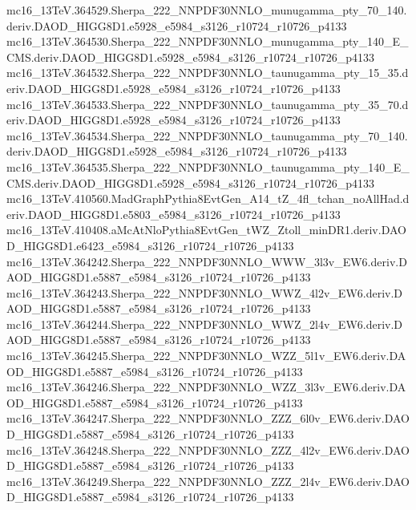 \begin{scriptsize}
mc16\_13TeV.364529.Sherpa\_222\_NNPDF30NNLO\_munugamma\_pty\_70\_140.deriv.DAOD\_HIGG8D1.e5928\_e5984\_s3126\_r10724\_r10726\_p4133 \\
mc16\_13TeV.364530.Sherpa\_222\_NNPDF30NNLO\_munugamma\_pty\_140\_E\_CMS.deriv.DAOD\_HIGG8D1.e5928\_e5984\_s3126\_r10724\_r10726\_p4133 \\
mc16\_13TeV.364532.Sherpa\_222\_NNPDF30NNLO\_taunugamma\_pty\_15\_35.deriv.DAOD\_HIGG8D1.e5928\_e5984\_s3126\_r10724\_r10726\_p4133 \\
mc16\_13TeV.364533.Sherpa\_222\_NNPDF30NNLO\_taunugamma\_pty\_35\_70.deriv.DAOD\_HIGG8D1.e5928\_e5984\_s3126\_r10724\_r10726\_p4133 \\
mc16\_13TeV.364534.Sherpa\_222\_NNPDF30NNLO\_taunugamma\_pty\_70\_140.deriv.DAOD\_HIGG8D1.e5928\_e5984\_s3126\_r10724\_r10726\_p4133 \\
mc16\_13TeV.364535.Sherpa\_222\_NNPDF30NNLO\_taunugamma\_pty\_140\_E\_CMS.deriv.DAOD\_HIGG8D1.e5928\_e5984\_s3126\_r10724\_r10726\_p4133 \\
mc16\_13TeV.410560.MadGraphPythia8EvtGen\_A14\_tZ\_4fl\_tchan\_noAllHad.deriv.DAOD\_HIGG8D1.e5803\_e5984\_s3126\_r10724\_r10726\_p4133 \\
mc16\_13TeV.410408.aMcAtNloPythia8EvtGen\_tWZ\_Ztoll\_minDR1.deriv.DAOD\_HIGG8D1.e6423\_e5984\_s3126\_r10724\_r10726\_p4133 \\
mc16\_13TeV.364242.Sherpa\_222\_NNPDF30NNLO\_WWW\_3l3v\_EW6.deriv.DAOD\_HIGG8D1.e5887\_e5984\_s3126\_r10724\_r10726\_p4133 \\
mc16\_13TeV.364243.Sherpa\_222\_NNPDF30NNLO\_WWZ\_4l2v\_EW6.deriv.DAOD\_HIGG8D1.e5887\_e5984\_s3126\_r10724\_r10726\_p4133 \\
mc16\_13TeV.364244.Sherpa\_222\_NNPDF30NNLO\_WWZ\_2l4v\_EW6.deriv.DAOD\_HIGG8D1.e5887\_e5984\_s3126\_r10724\_r10726\_p4133 \\
mc16\_13TeV.364245.Sherpa\_222\_NNPDF30NNLO\_WZZ\_5l1v\_EW6.deriv.DAOD\_HIGG8D1.e5887\_e5984\_s3126\_r10724\_r10726\_p4133 \\
mc16\_13TeV.364246.Sherpa\_222\_NNPDF30NNLO\_WZZ\_3l3v\_EW6.deriv.DAOD\_HIGG8D1.e5887\_e5984\_s3126\_r10724\_r10726\_p4133 \\
mc16\_13TeV.364247.Sherpa\_222\_NNPDF30NNLO\_ZZZ\_6l0v\_EW6.deriv.DAOD\_HIGG8D1.e5887\_e5984\_s3126\_r10724\_r10726\_p4133 \\
mc16\_13TeV.364248.Sherpa\_222\_NNPDF30NNLO\_ZZZ\_4l2v\_EW6.deriv.DAOD\_HIGG8D1.e5887\_e5984\_s3126\_r10724\_r10726\_p4133 \\
mc16\_13TeV.364249.Sherpa\_222\_NNPDF30NNLO\_ZZZ\_2l4v\_EW6.deriv.DAOD\_HIGG8D1.e5887\_e5984\_s3126\_r10724\_r10726\_p4133 \\

\end{scriptsize}

